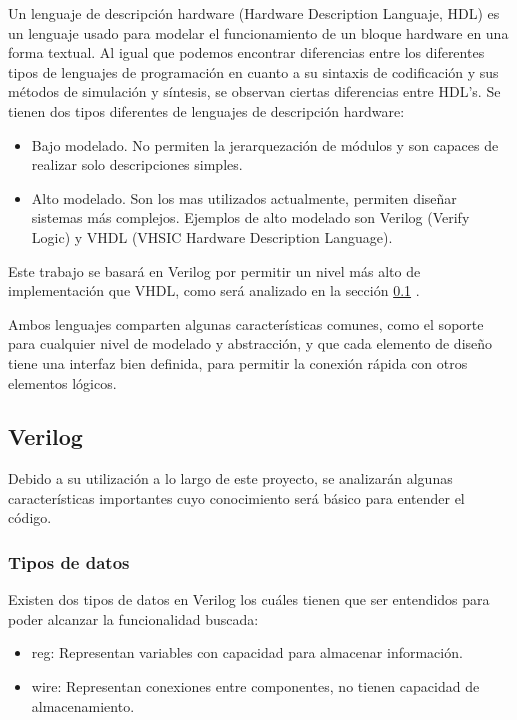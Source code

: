Un lenguaje de descripción hardware (Hardware Description Languaje, HDL) es un lenguaje usado para modelar el funcionamiento de un bloque hardware en una forma textual. Al igual que podemos encontrar diferencias entre los diferentes tipos de lenguajes de programación en cuanto a su sintaxis de codificación y sus métodos de simulación y síntesis, se observan ciertas diferencias entre HDL's. \newline
Se tienen dos tipos diferentes de lenguajes de descripción hardware:
\begin{itemize}
	\item Bajo modelado. No permiten la jerarquezación de módulos y son capaces de realizar solo descripciones simples.
	\item Alto modelado. Son los mas utilizados actualmente, permiten diseñar sistemas más complejos. Ejemplos de alto modelado son Verilog (Verify Logic) y VHDL (VHSIC Hardware Description Language).
\end{itemize}	
Este trabajo se basará en Verilog por permitir un nivel más alto de implementación que VHDL, como será analizado en la sección \ref{sec:Verilog} . \newline

Ambos lenguajes comparten algunas características comunes, como el soporte para cualquier nivel de modelado y abstracción, y que cada elemento de diseño tiene una interfaz bien definida, para permitir la conexión rápida con otros elementos lógicos.

\subsection{Verilog}\label{sec:Verilog}
Debido a su utilización a lo largo de este proyecto, se analizarán algunas características importantes cuyo conocimiento será básico para entender el código.

\subsubsection{Tipos de datos}

Existen dos tipos de datos en Verilog los cuáles tienen que ser entendidos para poder alcanzar la funcionalidad buscada:
\begin{itemize}
	\item reg: Representan variables con capacidad para almacenar información.
	\item wire: Representan conexiones entre componentes, no tienen capacidad de almacenamiento.
\end{itemize}

